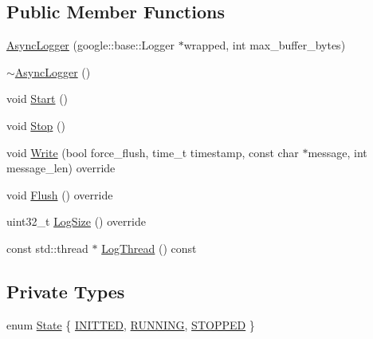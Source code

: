 \subsection*{Public Member Functions}
\begin{DoxyCompactItemize}
\item 
\hyperlink{classapollo_1_1cyber_1_1logger_1_1AsyncLogger_ab512ca5b0980840bd97187b8b8bf68a7}{Async\-Logger} (google\-::base\-::\-Logger $\ast$wrapped, int max\-\_\-buffer\-\_\-bytes)
\item 
\hyperlink{classapollo_1_1cyber_1_1logger_1_1AsyncLogger_ab81c56987b35eac2468293214cc0831a}{$\sim$\-Async\-Logger} ()
\item 
void \hyperlink{classapollo_1_1cyber_1_1logger_1_1AsyncLogger_a57a56cd44d68c932c229638169a8ece1}{Start} ()
\item 
void \hyperlink{classapollo_1_1cyber_1_1logger_1_1AsyncLogger_a36aceb58b08edfba1417d18d60996811}{Stop} ()
\item 
void \hyperlink{classapollo_1_1cyber_1_1logger_1_1AsyncLogger_abe281a699f379c7274ef0fc9fe171eab}{Write} (bool force\-\_\-flush, time\-\_\-t timestamp, const char $\ast$message, int message\-\_\-len) override
\item 
void \hyperlink{classapollo_1_1cyber_1_1logger_1_1AsyncLogger_a75894f5de117c03d05c013f2638639a1}{Flush} () override
\item 
uint32\-\_\-t \hyperlink{classapollo_1_1cyber_1_1logger_1_1AsyncLogger_af14fc46b26821895b40def530a4a5aeb}{Log\-Size} () override
\item 
const std\-::thread $\ast$ \hyperlink{classapollo_1_1cyber_1_1logger_1_1AsyncLogger_ac71b6d358d78e0912524c1b8359baa2f}{Log\-Thread} () const 
\end{DoxyCompactItemize}
\subsection*{Private Types}
\begin{DoxyCompactItemize}
\item 
enum \hyperlink{classapollo_1_1cyber_1_1logger_1_1AsyncLogger_ac693c5c55875861feb508ed2b60223a4}{State} \{ \hyperlink{classapollo_1_1cyber_1_1logger_1_1AsyncLogger_ac693c5c55875861feb508ed2b60223a4a05e01a42de2ef2f76fc008c2f2ac0b11}{I\-N\-I\-T\-T\-E\-D}, 
\hyperlink{classapollo_1_1cyber_1_1logger_1_1AsyncLogger_ac693c5c55875861feb508ed2b60223a4ad883b067d35376bd78b0f301a0200704}{R\-U\-N\-N\-I\-N\-G}, 
\hyperlink{classapollo_1_1cyber_1_1logger_1_1AsyncLogger_ac693c5c55875861feb508ed2b60223a4a26a879c1a0c30577cff7af5688a3b55f}{S\-T\-O\-P\-P\-E\-D}
 \}
\end{DoxyCompactItemize}

